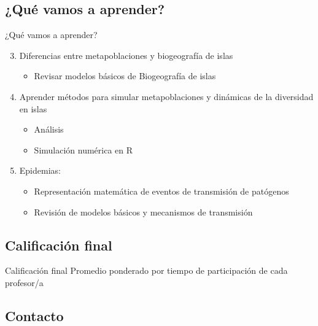 \documentclass[
  11pt,
  ignorenonframetext,
]{beamer}
\providecommand{\tightlist}{%
  \setlength{\itemsep}{0pt}\setlength{\parskip}{0pt}}
\begin{document}
\hypertarget{quuxe9-vamos-a-aprender-1}{%
\subsection{¿Qué vamos a aprender?}\label{quuxe9-vamos-a-aprender-1}}

\begin{frame}{¿Qué vamos a aprender?}
\begin{enumerate}
\setcounter{enumi}{2}
\item
  Diferencias entre metapoblaciones y biogeografía de islas

  \begin{itemize}
  \tightlist
  \item
    Revisar modelos básicos de Biogeografía de islas
  \end{itemize}
\item
  Aprender métodos para simular metapoblaciones y dinámicas de la
  diversidad en islas

  \begin{itemize}
  \item
    Análisis
  \item
    Simulación numérica en R
  \end{itemize}
\item
  Epidemias:

  \begin{itemize}
  \item
    Representación matemática de eventos de transmisión de patógenos
  \item
    Revisión de modelos básicos y mecanismos de transmisión
  \end{itemize}
\end{enumerate}
\end{frame}

\hypertarget{calificaciuxf3n-final}{%
\subsection{Calificación final}\label{calificaciuxf3n-final}}

\begin{frame}{Calificación final}
Promedio ponderado por tiempo de participación de cada profesor/a
\end{frame}

\hypertarget{contacto}{%
\subsection{Contacto}\label{contacto}}
\end{document}
